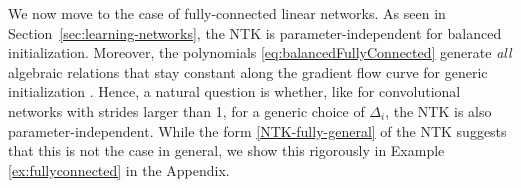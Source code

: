 \documentclass[twoside]{article}
\theoremstyle{definition}
\newtheorem{example}[theorem]{Example}
\theoremstyle{remark}
\begin{document}
We now move to the case of fully-connected linear networks. As seen in Section~\ref{sec:learning-networks}, the NTK is parameter-independent for balanced initialization.
Moreover, the polynomials  \eqref{eq:balancedFullyConnected} generate \emph{all} algebraic relations that stay constant along the gradient flow curve for generic initialization \citep{marcotte2024abide}. Hence,
a natural question is whether, like for convolutional networks with strides larger than 1, for a generic choice of $\Delta_i$, the NTK is also parameter-independent. While the form \eqref{NTK-fully-general} of the NTK suggests that this is not the case in general, we show this rigorously in Example \ref{ex:fullyconnected} in the Appendix.

\end{document}
